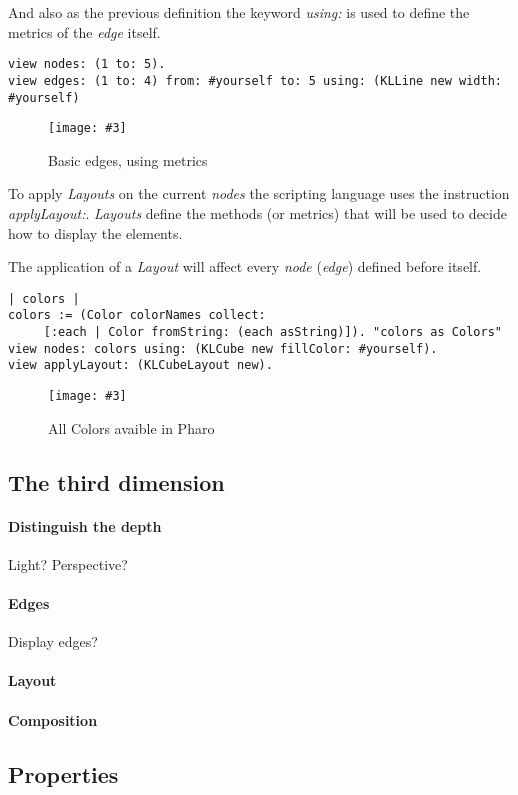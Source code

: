\documentclass[runningheads]{llncs}
\newcommand{\fig}[4]{
	\begin{figure}[#1]
		\centering
		\texttt{[image: \#3]}
		\caption{\label{fig:#3}#4}
	\end{figure}}
\newcommand{\seclabel}[1]{\label{sec:#1}}
\begin{document}
And also as the previous definition the keyword \emph{using:} is used
to define the metrics of the \emph{edge} itself.  
\begin{lstlisting}
view nodes: (1 to: 5).	
view edges: (1 to: 4) from: #yourself to: 5 using: (KLLine new width: #yourself)
\end{lstlisting}
\fig{}{0.5}{figure5.png}{Basic edges, using metrics}

To apply \emph{Layouts} on the current \emph{nodes} the scripting
language uses the instruction \emph{applyLayout:}. \emph{Layouts}
define the methods (or metrics) that will be used to decide how
to display the elements.

The application of a \emph{Layout} will affect every \emph{node} 
(\emph{edge}) defined before itself.
\begin{lstlisting}
| colors |
colors := (Color colorNames collect: 
	 [:each | Color fromString: (each asString)]). "colors as Colors"
view nodes: colors using: (KLCube new fillColor: #yourself).
view applyLayout: (KLCubeLayout new).
\end{lstlisting}
\fig{}{0.3}{figure6.png}{All Colors avaible in Pharo}
 
\subsection{The third dimension} \seclabel{3d}

\paragraph{Distinguish the depth} Light? Perspective? 

\paragraph{Edges} Display edges?

\paragraph{Layout}

\paragraph{Composition}

\subsection{Properties} \seclabel{properties}
\end{document}
